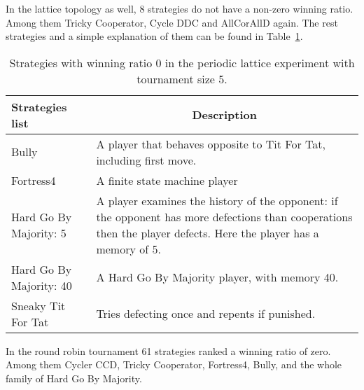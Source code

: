In the lattice topology as well, 8 strategies do not have
a non-zero winning ratio. Among them Tricky Cooperator, Cycle DDC and AllCorAllD
again. The rest strategies and a simple explanation of them can be found in
Table~\ref{winning-ratio-zero-lattice-five}.

\begin{table}[h]
\centering
\begin{adjustbox}{width=1\textwidth}
\small
\centering
\begin{tabular}{|l|l|}
\hline
Strategies list         & \multicolumn{1}{c|}{Description}                                                                                                                                                                           \\ \hline
Bully                   & A player that behaves opposite to Tit For Tat, including first move.                                                                                                                                       \\ \hline
Fortress4               & A finite state machine player                                                                                                                                                                              \\ \hline
Hard Go By Majority: 5  & A player examines the history of the opponent: if the opponent has more defections than cooperations then the player defects. Here the player has a memory of 5.                                            \\ \hline
Hard Go By Majority: 40 & A Hard Go By Majority player, with memory 40.                                                                                                                                                              \\ \hline
Sneaky Tit For Tat      & Tries defecting once and repents if punished.                                                                                                                                                              \\ \hline
\end{tabular}
\end{adjustbox}
\caption{Strategies with winning ratio 0 in the periodic lattice experiment with
         tournament size 5.}
\label{winning-ratio-zero-lattice-five}
\end{table}

In the round robin tournament 61 strategies ranked a winning ratio of zero.
Among them Cycler CCD, Tricky Cooperator, Fortress4, Bully, and the whole family
of Hard Go By Majority.

